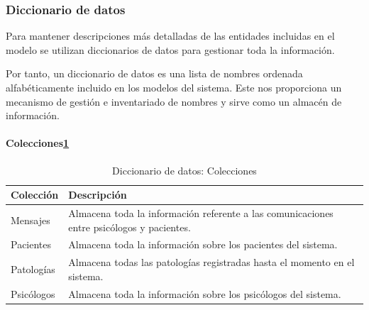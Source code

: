 \subsubsection{Diccionario de datos}
Para mantener descripciones más detalladas de las entidades incluidas en el modelo se utilizan diccionarios de datos para gestionar toda la información.


Por tanto, un diccionario de datos es una lista de nombres ordenada alfabéticamente incluido en los modelos del sistema. Este nos proporciona un mecanismo de gestión e inventariado de nombres y sirve como un almacén de información.


\paragraph{Colecciones\ref{fig:dic_datos_colecciones}}

\begin{table}[htpb]
\centering
\begin{tabularx}{\textwidth}{|l|X|}
\hline
Colección  & Descripción                                                                               \\ \hline
Mensajes   & Almacena toda la información referente a las comunicaciones entre psicólogos y pacientes. \\ \hline
Pacientes  & Almacena toda la información sobre los pacientes del sistema.                             \\ \hline
Patologías & Almacena todas las patologías registradas hasta el momento en el sistema.                 \\ \hline
Psicólogos & Almacena toda la información sobre los psicólogos del sistema.                            \\ \hline
\end{tabularx}
\caption{Diccionario de datos: Colecciones}
\label{fig:dic_datos_colecciones}
\end{table}

